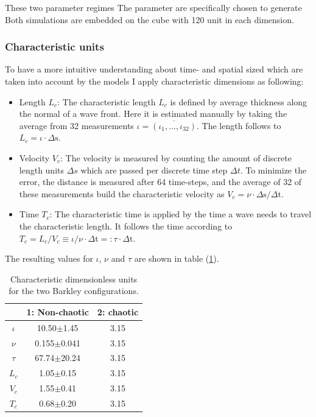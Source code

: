 These two parameter regimes 
The parameter are specifically chosen to generate
Both simulations are embedded on the cube with 120 unit in each dimension. 

\subsubsection{Characteristic units}

To have a more intuitive understanding about time- and spatial sized which are taken into account by the models I apply characteristic dimensions as following:

\begin{itemize}
    \item Length $L_c$: The characteristic length $L_c$ is defined by average thickness along the normal of a wave front. Here it is estimated manually by taking the average from 32 measurements $\iota=\overline{(\iota_1,...,\iota_{32})}$. The length follows to $L_c=\iota\cdot\Delta\text{s}$.
    \item Velocity $V_c$: The velocity is measured by counting the amount of discrete length units $\Delta s$ which are passed per discrete time step $\Delta t$. To minimize the error, the distance is measured after 64 time-steps, and the average of 32 of these measurements build the characteristic velocity as $V_c=\nu\cdot\Delta\text{s}/\Delta\text{t}$.
    
    \item Time $T_c$: The characteristic time is applied by the time a wave needs to travel the characteristic length. It follows the time according to $T_c=L_c/V_c\equiv\iota/\nu\cdot\Delta\text{t}=:\tau\cdot\Delta\text{t}$.
\end{itemize}

The resulting values for $\iota$, $\nu$ and $\tau$ are shown in table (\ref{tab:characteristic}). 

\begin{table}[h]
    \centering
    \begin{tabular}{|c|c|c|}
    \hline
    & 1: Non-chaotic & 2: chaotic\\
    \hline
    $\iota$ & 10.50$\pm$1.45 & 3.15 \\
    \hline
    $\nu$ & 0.155$\pm$0.041 & 3.15 \\
    \hline
    $\tau$ & 67.74$\pm$20.24 & 3.15 \\ %
    \hline
    $L_c$ & 1.05$\pm$0.15 & 3.15 \\ %
    \hline
    $V_c$ & 1.55$\pm$0.41 & 3.15 \\ %
    \hline
    $T_c$ & 0.68$\pm$0.20 & 3.15 \\ %
    \hline
    \end{tabular}
    \caption{Characteristic dimensionless units for the two Barkley configurations.}
    \label{tab:characteristic}
\end{table}

